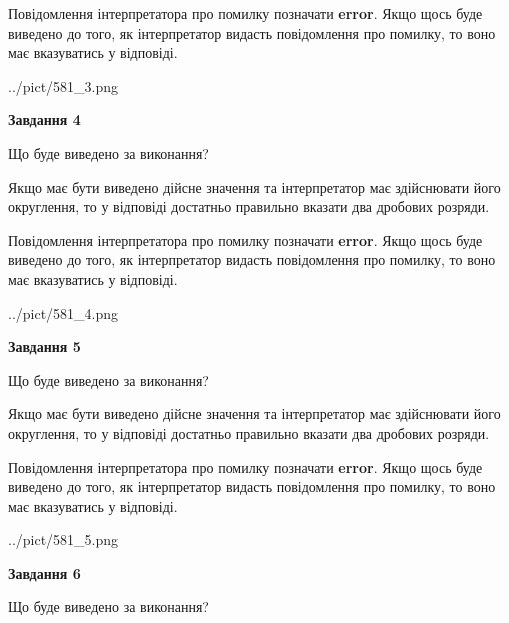 \documentclass[12pt, ukrainian]{article}
\begin{document}
{\begin {Large}
Повідомлення інтерпретатора про помилку позначати \textbf{error}.
Якщо щось буде виведено до того, як інтерпретатор видасть повідомлення про помилку, 
то воно має вказуватись у відповіді. \par

\begin{center}
	{../pict/581_3.png}
\end{center}
\newpage

{\begin {center}\textbf{Завдання 4}\end {center}}\par
Що буде виведено за виконання? \par

Якщо має бути виведено дійсне значення та інтерпретатор має здійснювати його округлення, 
то у відповіді достатньо правильно вказати два дробових розряди.

Повідомлення інтерпретатора про помилку позначати \textbf{error}.
Якщо щось буде виведено до того, як інтерпретатор видасть повідомлення про помилку, 
то воно має вказуватись у відповіді. \par

\begin{center}
	{../pict/581_4.png}
\end{center}
\newpage

{\begin {center}\textbf{Завдання 5}\end {center}}\par
Що буде виведено за виконання? \par

Якщо має бути виведено дійсне значення та інтерпретатор має здійснювати його округлення, 
то у відповіді достатньо правильно вказати два дробових розряди.

Повідомлення інтерпретатора про помилку позначати \textbf{error}.
Якщо щось буде виведено до того, як інтерпретатор видасть повідомлення про помилку, 
то воно має вказуватись у відповіді. \par

\begin{center}
	{../pict/581_5.png}
\end{center}
\newpage

{\begin {center}\textbf{Завдання 6}\end {center}}\par
Що буде виведено за виконання? \par


\end{Large}}
\end{document}
